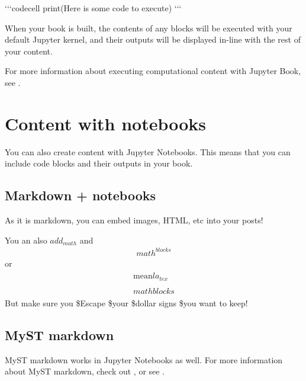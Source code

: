 \documentclass[letterpaper,10pt,english]{sphinxmanual}
\begin{document}
\begin{sphinxVerbatim}[commandchars=\\\{\}]
{}`{}`{}`\PYGZob{}code\PYGZhy{}cell\PYGZcb{}
print(\PYGZdq{}Here is some code to execute\PYGZdq{})
{}`{}`{}`
\end{sphinxVerbatim}

When your book is built, the contents of any  blocks will be
executed with your default Jupyter kernel, and their outputs will be displayed
in-line with the rest of your content.

For more information about executing computational content with Jupyter Book,
see .


\section{Content with notebooks}
\label{\detokenize{notebooks:content-with-notebooks}}\label{\detokenize{notebooks::doc}}
You can also create content with Jupyter Notebooks. This means that you can include
code blocks and their outputs in your book.


\subsection{Markdown + notebooks}
\label{\detokenize{notebooks:markdown-notebooks}}
As it is markdown, you can embed images, HTML, etc into your posts!


You an also \(add_{math}\) and
\begin{equation*}
\begin{split}
math^{blocks}
\end{split}
\end{equation*}
or
\begin{equation*}
\begin{split}
\begin{aligned}
\mbox{mean} la_{tex} \\ \\
math blocks
\end{aligned}
\end{split}
\end{equation*}
But make sure you \$Escape \$your \$dollar signs \$you want to keep!


\subsection{MyST markdown}
\label{\detokenize{notebooks:myst-markdown}}
MyST markdown works in Jupyter Notebooks as well. For more information about MyST markdown, check
out ,
or see .
\end{document}
